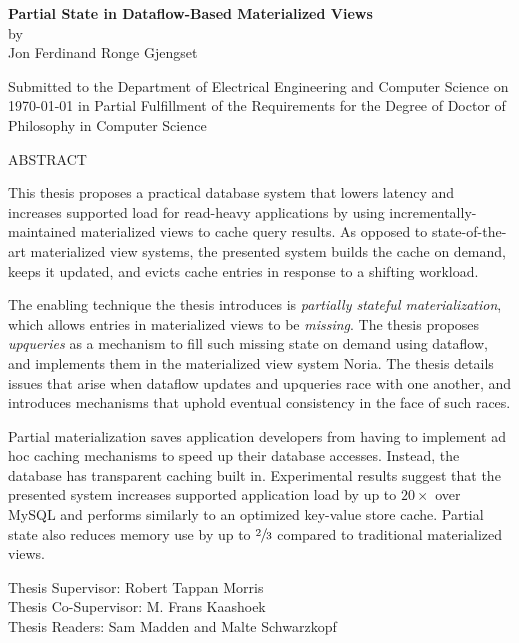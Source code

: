 \documentclass[fontsize=12pt,paper=letter]{scrartcl}
\begin{document}
\begin{titlepage}
  \begin{center}
    \textbf{\large Partial State in Dataflow-Based Materialized Views}\\
    \vspace{0.5\baselineskip}
    by\\
    \vspace{0.5\baselineskip}
    {\large Jon Ferdinand Ronge Gjengset}\\
    \vspace{0.5\baselineskip}
    \begin{addmargin}[0.15in]{0.15in}
      \centering
    Submitted to the Department of
    Electrical Engineering and Computer Science
    on \today{}
    in Partial Fulfillment of the Requirements for the Degree of
    Doctor of Philosophy in Computer Science
    \end{addmargin}
  \end{center}

  \begin{flushleft}
  ABSTRACT
  \vspace{0.5\baselineskip}

  This thesis proposes a practical database system that lowers latency and
    increases supported load for read-heavy applications by using
    incrementally-maintained materialized views to cache query results. As
    opposed to state-of-the-art materialized view systems, the presented system
    builds the cache on demand, keeps it updated, and evicts cache entries in
    response to a shifting workload.

  \vspace{0.5\baselineskip}

  The enabling technique the thesis introduces is \textit{partially stateful
    materialization}, which allows entries in materialized views to be
    \textit{missing}. The thesis proposes \textit{upqueries} as a mechanism to
    fill such missing state on demand using dataflow, and implements them in the
    materialized view system Noria. The thesis details issues that arise when
    dataflow updates and upqueries race with one another, and introduces
    mechanisms that uphold eventual consistency in the face of such races.

  \vspace{0.5\baselineskip}

  Partial materialization saves application developers from having to implement
    ad hoc caching mechanisms to speed up their database accesses. Instead, the
    database has transparent caching built in. Experimental results suggest that
    the presented system increases supported application load by up to
    $20\times$ over MySQL and performs similarly to an optimized key-value store
    cache. Partial state also reduces memory use by up to $\sfrac{2}{3}$
    compared to traditional materialized views.

  \vspace{\baselineskip}
  Thesis Supervisor: Robert Tappan Morris\\
  Thesis Co-Supervisor: M. Frans Kaashoek\\
  Thesis Readers: Sam Madden and Malte Schwarzkopf
  \end{flushleft}
\end{titlepage}
\end{document}
